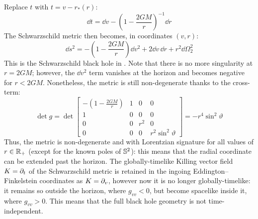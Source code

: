 Replace $ t $ with $ t = v - r_*(r) $:
\begin{equation*}
  \dd t = \dd v - \left( 1 - \frac{2GM}{r} \right)^{-1} \dd r
\end{equation*}
The Schwarzschild metric then becomes, in coordinates $ (v,r) $:
\begin{equation}
  \dd s^2 = - \left( 1 - \frac{2GM}{r} \right) \dd v^2 + 2 \dd v\,\dd r + r^2 \dd \Omega_2^2
  \label{eq:ingoing-coord}
\end{equation}
This is the Schwarzschild black hole in . Note that there is no more singularity at $ r = 2GM $; however, the $ \dd v^2 $ term vanishes at the horizon and becomes negative for $ r < 2GM $. Nonetheless, the metric is still non-degenerate thanks to the cross-term:
\begin{equation*}
  \det g = \det
  \begin{bmatrix}
    - (1 - \frac{2GM}{r}) & 1 & 0 & 0 \\
    1 & 0 & 0 & 0 \\
    0 & 0 & r^2 & 0 \\
    0 & 0 & 0 & r^2 \sin^2 \vartheta
  \end{bmatrix}
  = - r^4 \sin^2 \vartheta
\end{equation*}
Thus, the metric is non-degenerate and with Lorentzian signature for all values of $ r \in \mathbb{R}_+ $ (except for the known poles of $ \mathbb{S}^{2} $): this means that the radial coordinate can be extended past the horizon. The globally-timelike Killing vector field $ K = \partial_t $ of the Schwarzschild metric is retained in the ingoing Eddington--Finkelstein coordinates as $ K = \partial_v $, however now it is no longer globally-timelike: it remains so outside the horizon, where $ g_{vv} < 0 $, but become spacelike inside it, where $ g_{vv} > 0 $. This means that the full black hole geometry is not time-independent.

